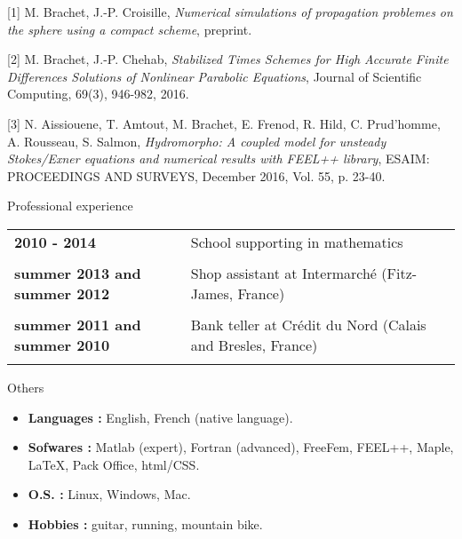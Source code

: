 \documentclass[10pt,a4paper]{report}
\begin{document}
[1] {\sc  M. Brachet, J.-P. Croisille}, {\sl Numerical simulations of propagation problemes on the sphere using a compact scheme}, preprint.

\vspace{0.6cm}

[2] {\sc M. Brachet, J.-P. Chehab}, {\sl Stabilized Times Schemes for High Accurate Finite Differences Solutions of Nonlinear Parabolic Equations}, Journal of Scientific Computing, 69(3), 946-982, 2016.

\vspace{0.6cm}

[3] {\sc  N. Aissiouene, T. Amtout, M. Brachet, E. Frenod, R. Hild, C. Prud'homme, A. Rousseau, S. Salmon}, {\sl  Hydromorpho: A coupled model for unsteady Stokes/Exner equations and numerical results with FEEL++ library}, ESAIM: PROCEEDINGS AND SURVEYS, December 2016, Vol. 55, p. 23-40.






\vspace{1cm}
\noindent
{\selectfont
\begin{Large}
Professional experience
\end{Large}
\hrulefill
}

\vspace{0.6cm}
\noindent
\begin{center}
\begin{tabular}{p{5cm} p{10cm}}
\textbf{2010 - 2014} & School supporting in mathematics\\

& \\

\textbf{summer 2013 and summer 2012} & Shop assistant at Intermarché (Fitz-James, France) \\

& \\

\textbf{summer 2011 and summer 2010} & Bank teller at Crédit du Nord (Calais and Bresles, France) \\

& \\

\end{tabular}
\end{center}


\vspace{0.6cm}
\noindent
{\selectfont
\begin{Large}
Others
\end{Large}
\hrulefill
}

\vspace{1cm}
\noindent
\begin{itemize}
\item \textbf{Languages :} English, French (native language).
\item \textbf{Sofwares :} Matlab (expert), Fortran (advanced), FreeFem, FEEL++, Maple, \LaTeX, Pack Office, html/CSS.
\item \textbf{O.S. :} Linux, Windows, Mac.
\item \textbf{Hobbies :} guitar, running, mountain bike.

\end{itemize}
\end{document}
